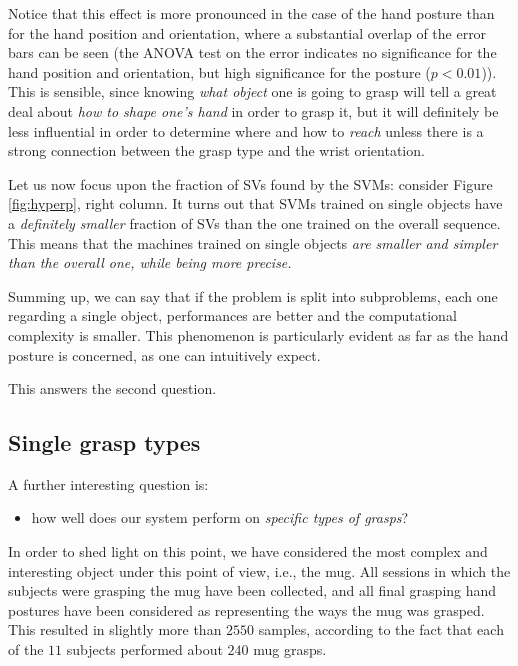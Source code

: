 Notice that this effect is more pronounced in the case of the hand
posture than for the hand position and orientation, where a
substantial overlap of the error bars can be seen (the ANOVA test on
the error indicates no significance for the hand position and
orientation, but high significance for the posture ($p<0.01$)). This is sensible,
since knowing \emph{what object} one is going to grasp will tell a
great deal about \emph{how to shape one's hand} in order to grasp it,
but it will definitely be less influential in order to determine where
and how to \emph{reach} unless there is a strong connection between
the grasp type and the wrist orientation.

Let us now focus upon the fraction of SVs found by the SVMs: consider
Figure \ref{fig:hyperp}, right column. It turns out that SVMs trained
on single objects have a \emph{definitely smaller} fraction of SVs
than the one trained on the overall sequence. This means that the
machines trained on single objects \emph{are smaller and simpler than
the overall one, while being more precise.}

Summing up, we can say that if the problem is split into subproblems,
each one regarding a single object, performances are better and the
computational complexity is smaller. This phenomenon is particularly
evident as far as the hand posture is concerned, as one can
intuitively expect.

This answers the second question.

\subsection{Single grasp types}

A further interesting question is:

\begin{itemize}

  \item how well does our system perform on \emph{specific types of
    grasps}?

\end{itemize}

In order to shed light on this point, we have considered the most
complex and interesting object under this point of view, i.e., the
mug. All sessions in which the subjects were grasping the mug have
been collected, and all final grasping hand postures have been
considered as representing the ways the mug was grasped. This resulted
in slightly more than $2550$ samples, according to the fact that each
of the $11$ subjects performed about $240$ mug grasps.

